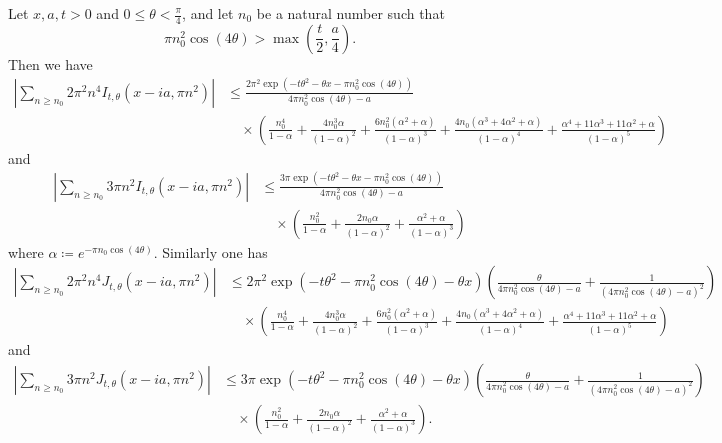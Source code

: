 \begin{corollary}  Let $x,a,t>0$ and $0 \leq \theta < \frac{\pi}{4}$, and let $n_0$ be a natural number such that
$$\pi n_0^2 \cos(4\theta) > \max(\frac{t}{2}, \frac{a}{4} ).$$
Then we have
\begin{equation}\label{itail1}
\begin{split}
\left|\sum_{n \geq n_0} 2\pi^2 n^4 I_{t,\theta}(x-ia, \pi n^2)\right| &\leq
\frac{2\pi^2 \exp(-t \theta^2 - \theta x - \pi n_0^2 \cos(4\theta))}{4\pi n_0^2 \cos(4\theta) - a} \\
&\quad \times \left( \frac{n_0^4}{1 - \alpha} + 
\frac{4 n_0^3 \alpha}{(1 - \alpha)^2}  + \frac{6 n_0^2 (\alpha^2+\alpha)}{(1-\alpha)^3} + \frac{4n_0 (\alpha^3+4\alpha^2+\alpha)}{(1-\alpha)^4} + \frac{\alpha^4 + 11 \alpha^3 + 11 \alpha^2 + \alpha}{(1-\alpha)^5} \right)
\end{split}
\end{equation}
and
\begin{equation}\label{itail2}
\begin{split}
\left|\sum_{n \geq n_0} 3\pi n^2 I_{t,\theta}(x-ia, \pi n^2)\right| &\leq
\frac{3\pi \exp(-t \theta^2 - \theta x - \pi n_0^2 \cos(4\theta))}{4\pi n_0^2 \cos(4\theta) - a} \\
&\quad \times ( \frac{n_0^2}{1-\alpha} + \frac{2n_0 \alpha}{(1-\alpha)^2} + \frac{\alpha^2+\alpha}{(1-\alpha)^3} )
\end{split}
\end{equation}
where $\alpha \coloneqq  e^{-\pi n_0 \cos(4\theta)}$.  Similarly one has
\begin{equation}\label{jtail1}
\begin{split}
 |\sum_{n \geq n_0} 2\pi^2 n^4 J_{t,\theta}(x-ia, \pi n^2)| &\leq 2\pi^2 \exp( -t \theta^2 - \pi n_0^2 \cos(4\theta) - \theta x )
( \frac{\theta}{4 \pi n_0^2 \cos(4\theta) - a} + \frac{1}{(4 \pi n_0^2 \cos(4 \theta) - a)^2} )\\
&\quad \times ( \frac{n_0^4}{1 - \alpha} + 
\frac{4 n_0^3 \alpha}{(1 - \alpha)^2}  + \frac{6 n_0^2 (\alpha^2+\alpha)}{(1-\alpha)^3} + \frac{4n_0 (\alpha^3+4\alpha^2+\alpha)}{(1-\alpha)^4} + \frac{\alpha^4 + 11 \alpha^3 + 11 \alpha^2 + \alpha}{(1-\alpha)^5} )
\end{split}
\end{equation}
and
\begin{equation}\label{jtail2}
\begin{split}
 |\sum_{n \geq n_0} 3\pi n^2 J_{t,\theta}(x-ia, \pi n^2)| &\leq 3\pi \exp( -t \theta^2 - \pi n_0^2 \cos(4\theta) - \theta x )
( \frac{\theta}{4 \pi n_0^2 \cos(4\theta) - a} + \frac{1}{(4 \pi n_0^2 \cos(4\theta) - a)^2} )\\
&\quad \times ( \frac{n_0^2}{1-\alpha} + \frac{2n_0 \alpha}{(1-\alpha)^2} + \frac{\alpha^2+\alpha}{(1-\alpha)^3} ).
\end{split}
\end{equation}
\end{corollary}

